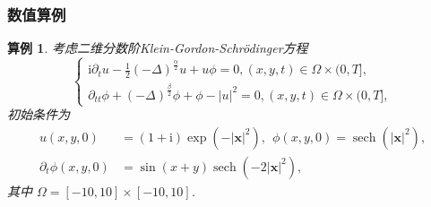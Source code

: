 \documentclass[aspectratio=169]{beamer}
\newtheorem{myexample}{算例}[section] %
\numberwithin{theorem}{section} %
\numberwithin{equation}{section}%
\numberwithin{figure}{section}%
\numberwithin{table}{section}%
\begin{document}
\begin{frame}\frametitle{数值算例}
	\begin{myexample}\label{exp_SAVRRK:4}
		考虑二维分数阶Klein-Gordon-Schr{\"o}dinger方程\cite{fuStructurepreservingAlgorithmsTwodimensional2020} 
		\begin{equation}
		\begin{cases}
		\mathrm{i} \partial_t u-\frac{1}{2}(-\Delta)^{\frac{\alpha}{2}} u+u \phi=0,(x, y, t) \in \Omega \times(0, T],\\
		\partial_{t t} \phi+(-\Delta)^{\frac{\beta}{2}} \phi+\phi-|u|^2=0, (x, y, t) \in \Omega \times(0, T],
		\end{cases}
		\end{equation}
		初始条件为
		\begin{equation}
			\begin{aligned}
				u(x, y, 0)&=(1+\mathrm{i}) \exp \left(-|\boldsymbol{x}|^2\right),~~\phi(x, y, 0)=\operatorname{sech}\left(|\boldsymbol{x}|^2\right),\\
				\partial_t \phi(x, y, 0)&=\sin (x+y) \operatorname{sech}\left(-2|\boldsymbol{x}|^2\right),
			\end{aligned}
		\end{equation}
		其中 $\Omega=[-10,10] \times[-10,10]$.
		\end{myexample}
\end{frame}
\end{document}
